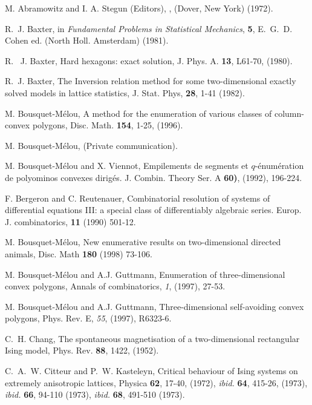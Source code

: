 \begin{thebibliography}{10}




M. Abramowitz and I. A. Stegun (Editors),
, 
(Dover, New York) (1972).

R.~J. Baxter,
\newblock in {\em Fundamental Problems in Statistical Mechanics},
{\bf 5}, E.~G.~D. Cohen ed. (North Holl. Amsterdam) (1981).

  R. ~J. Baxter,
  \newblock Hard hexagons: exact solution, J. Phys. A. {\bf 13}, L61-70, (1980).

R.~J. Baxter,
\newblock The Inversion relation method for some two-dimensional
exactly solved models in lattice statistics, 
J. Stat. Phys, {\bf 28}, 1-41 (1982).


  M. Bousquet-M\'elou,
  \newblock A method for the enumeration of various classes of column-convex
  polygons, Disc. Math. {\bf 154}, 1-25, (1996).

  M. Bousquet-M\'elou,
  \newblock (Private communication).

  M. Bousquet-M\'elou and X. Viennot,
  \newblock Empilements de segments et $q$-\'enum\'eration
  de polyominos convexes dirig\'es. J. Combin. Theory Ser. A {\bf 60)},
  (1992), 196-224.

F. Bergeron and C. Reutenauer,
\newblock Combinatorial resolution of systems of differential equations III: a
special class of differentiably algebraic series. Europ. J. combinatorics,
{\bf 11} (1990) 501-12.

M. Bousquet-M\'elou,
\newblock New enumerative results on two-dimensional directed animals,
Disc. Math {\bf180} (1998) 73-106.

  M. Bousquet-M\'elou and A.J. Guttmann,
\newblock  Enumeration of three-dimensional convex polygons,
 Annals of combinatorics, {\em 1}, (1997), 27-53.
  
  M. Bousquet-M\'elou and A.J. Guttmann,
 \newblock Three-dimensional self-avoiding convex polygons,
  Phys. Rev. E, {\em 55}, (1997), R6323-6.

  
  C.~H. Chang, 
  \newblock The spontaneous magnetisation of a two-dimensional rectangular
  Ising model, Phys. Rev. {\bf 88}, 1422, (1952).

  C.~A.~W. Citteur and P.~W. Kasteleyn,
  \newblock Critical behaviour of Ising systems on extremely
  anisotropic lattices, Physica {\bf 62}, 17-40, (1972), {\em ibid.}
  {\bf 64}, 415-26, (1973),
  {\em ibid.} {\bf 66}, 94-110 (1973), {\em ibid.} {\bf 68}, 491-510 (1973).


\end{thebibliography}
